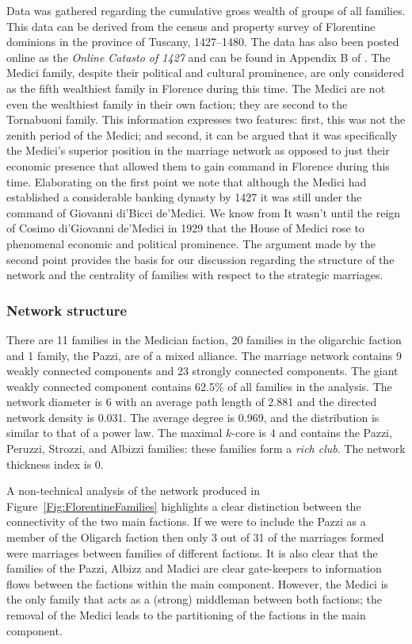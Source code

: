 Data was gathered regarding the cumulative gross wealth of groups of all families. This data can be derived from the census and property survey of Florentine dominions in the province of Tuscany, 1427--1480. The data has also been posted online as the \emph{Online Catasto of 1427} and can be found in Appendix B of \citet{Padgett1993}. The Medici family, despite their political and cultural prominence, are only considered as the fifth wealthiest family in Florence during this time. The Medici are not even the wealthiest family in their own faction; they are second to the Tornabuoni family. This information expresses two features: first, this was not the zenith period of the Medici; and second, it can be argued that it was specifically the Medici's superior position in the marriage network as opposed to just their economic presence that allowed them to gain command in Florence during this time. Elaborating on the first point we note that although the Medici had established a considerable banking dynasty by 1427 it was still under the command of Giovanni di'Bicci de'Medici. We know from  It wasn't until the reign of Cosimo di'Giovanni de'Medici in 1929 that the House of Medici rose to phenomenal economic and political prominence. The argument made by the second point provides the basis for our discussion regarding the structure of the network and the centrality of families with respect to the strategic marriages.

\subsubsection{Network structure}

There are 11 families in the Medician faction, 20 families in the oligarchic faction and 1 family, the Pazzi, are of a mixed alliance. The marriage network contains 9 weakly connected components and 23 strongly connected components. The giant weakly connected component contains 62.5\% of all families in the analysis. The network diameter is 6 with an average path length of 2.881 and the directed network density is 0.031. The average degree is 0.969, and the distribution is similar to that of a power law. The maximal $k$-core is 4 and contains the Pazzi, Peruzzi, Strozzi, and Albizzi families: these families form a \emph{rich club}. The network thickness index is 0.

A non-technical analysis of the network produced in Figure~\ref{Fig:FlorentineFamilies} highlights a clear distinction between the connectivity of the two main factions. If we were to include the Pazzi as a member of the Oligarch faction then only 3 out of 31 of the marriages formed were marriages between families of different factions. It is also clear that the families of the Pazzi, Albizz and Madici are clear gate-keepers to information flows between the factions within the main component. However, the Medici is the only family that acts as a (strong) middleman between both factions; the removal of the Medici leads to the partitioning of the factions in the main component.

